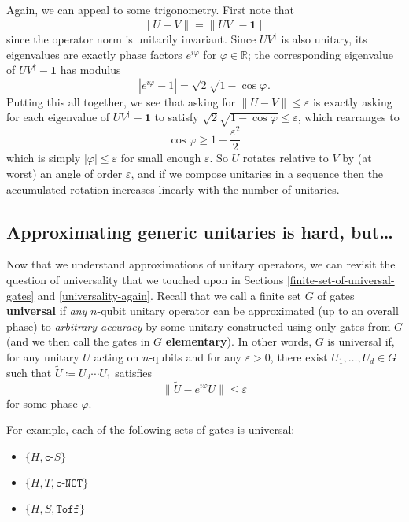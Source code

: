 \documentclass[fleqn]{article}
\providecommand{\tightlist}{%
  \setlength{\itemsep}{0pt}\setlength{\parskip}{0pt}}
\renewcommand{\footnote}[1]{\en{#1}}
\begin{document}
Again, we can appeal to some trigonometry.
First note that
\[
  \|U-V\| = \|UV^\dagger-\mathbf{1}\|
\]
since the operator norm is unitarily invariant.\footnote{See Exercise \ref{operator-norm}.}
Since \(UV^\dagger\) is also unitary, its eigenvalues are exactly phase factors \(e^{i\varphi}\) for \(\varphi\in\mathbb{R}\); the corresponding eigenvalue of \(UV^\dagger-\mathbf{1}\) has modulus
\[
  |e^{i\varphi}-1| = \sqrt{2}\sqrt{1-\cos\varphi}.
\]
Putting this all together, we see that asking for \(\|U-V\|\leqslant\varepsilon\) is exactly asking for each eigenvalue of \(UV^\dagger-\mathbf{1}\) to satisfy \(\sqrt{2}\sqrt{1-\cos\varphi}\leqslant\varepsilon\), which rearranges to
\[
  \cos\varphi \geqslant 1-\frac{\varepsilon^2}{2}
\]
which is simply \(|\varphi|\leqslant\varepsilon\) for small enough \(\varepsilon\).
So \(U\) rotates relative to \(V\) by (at worst) an angle of order \(\varepsilon\), and if we compose unitaries in a sequence then the accumulated rotation increases linearly with the number of unitaries.

\hypertarget{approximating-generic-unitaries-is-hard-but}{%
\subsection{Approximating generic unitaries is hard, but\ldots{}}\label{approximating-generic-unitaries-is-hard-but}}

Now that we understand approximations of unitary operators, we can revisit the question of universality that we touched upon in Sections \ref{finite-set-of-universal-gates} and \ref{universality-again}.
Recall that we call a finite set \(G\) of gates \textbf{universal} if \emph{any} \(n\)-qubit unitary operator can be approximated (up to an overall phase) to \emph{arbitrary accuracy} by some unitary constructed using only gates from \(G\) (and we then call the gates in \(G\) \textbf{elementary}).
In other words, \(G\) is universal if, for any unitary \(U\) acting on \(n\)-qubits and for any \(\varepsilon>0\), there exist \(U_1,\ldots,U_d\in G\) such that \(\widetilde{U}\coloneqq U_d\cdots U_1\) satisfies
\[
  \|\widetilde{U}-e^{i\varphi}U\|\leqslant\varepsilon
\]
for some phase \(\varphi\).

For example, each of the following sets of gates is universal:

\begin{itemize}
\tightlist
\item
  \(\{H,\texttt{c-}S\}\)
\item
  \(\{H,T,\texttt{c-NOT}\}\)
\item
  \(\{H,S,\texttt{Toff}\}\)
\end{itemize}
\end{document}
